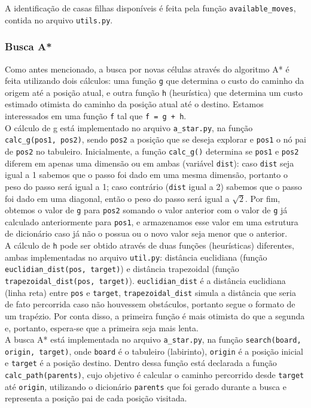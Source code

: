 \documentclass[12pt]{article}
\begin{document}
A identificação de casas filhas disponíveis é feita pela função \verb|available_moves|, contida no arquivo \verb|utils.py|.

\subsubsection{Busca A*}
Como antes mencionado, a busca por novas células através do algoritmo A* é feita utilizando dois cálculos: uma função \verb|g| que determina o custo do caminho da origem até a posição atual, e outra função \verb|h| (heurística) que determina um custo estimado otimista do caminho da posição atual até o destino. Estamos interessados em uma função \verb|f| tal que \verb|f = g + h|.\\

O cálculo de g está implementado no arquivo \verb|a_star.py|, na função \verb|calc_g(pos1, pos2)|, sendo \verb|pos2| a posição que se deseja explorar e \verb|pos1| o nó pai de \verb|pos2| no tabuleiro. Inicialmente, a função \verb|calc_g()| determina se \verb|pos1| e \verb|pos2| diferem em apenas uma dimensão ou em ambas (variável \verb|dist|): caso \verb|dist| seja igual a 1 sabemos que o passo foi dado em uma mesma dimensão, portanto o peso do passo será igual a 1; caso contrário (\verb|dist| igual a 2) sabemos que o passo foi dado em uma diagonal, então o peso do passo será igual a \(\sqrt{2}\). Por fim, obtemos o valor de \verb|g| para \verb|pos2| somando o valor anterior com o valor de \verb|g| já calculado anteriormente para \verb|pos1|, e armazenamos esse valor em uma estrutura de dicionário caso já não o possua ou o novo valor seja menor que o anterior.\\

A cálculo de \verb|h| pode ser obtido através de duas funções (heurísticas) diferentes, ambas implementadas no arquivo \verb|util.py|: distância euclidiana (função \verb|euclidian_dist(pos, target)|) e distância trapezoidal (função \verb|trapezoidal_dist(pos, target)|). \verb|euclidian_dist| é a distância euclidiana (linha reta) entre \verb|pos| e \verb|target|, \verb|trapezoidal_dist| simula a distância que seria de fato percorrida caso não houvessem obstáculos, portanto segue o formato de um trapézio. Por conta disso, a primeira função é mais otimista do que a segunda e, portanto, espera-se que a primeira seja mais lenta.\\

A busca A* está implementada no arquivo \verb|a_star.py|, na função \verb|search(board, origin, target)|, onde \verb|board| é o tabuleiro (labirinto), \verb|origin| é a posição inicial e \verb|target| é a posição destino. Dentro dessa função está declarada a função \verb|calc_path(parents)|, cujo objetivo é calcular o caminho percorrido desde \verb|target| até \verb|origin|, utilizando o dicionário \verb|parents| que foi gerado durante a busca e representa a posição pai de cada posição visitada.\\
\end{document}
